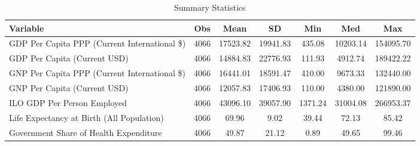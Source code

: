 \begin{table}
\centering
\caption{Summary Statistics}
\label{Sum_Stats}
\begin{tabular}{lcccccc}
\toprule
                                    Variable &  Obs &     Mean &       SD &     Min &      Med &       Max \\
\midrule
GDP Per Capita PPP (Current International \$) & 4066 & 17523.82 & 19941.83 & 435.08 & 10203.14 & 154095.70 \\
GDP Per Capita (Current USD) & 4066 & 14884.83 & 22776.93 & 111.93 & 4912.74 & 189422.22 \\
GNP Per Capita PPP (Current International \$) & 4066 & 16441.01 & 18591.47 & 410.00 & 9673.33 & 132440.00 \\
GNP Per Capita (Current USD) & 4066 & 12057.83 & 17406.93 & 110.00 & 4380.00 & 121890.00 \\
ILO GDP Per Person Employed & 4066 & 43096.10 & 39057.90 & 1371.24 & 31004.08 & 266953.37 \\
Life Expectancy at Birth (All Population) & 4066 & 69.96 & 9.02 & 39.44 & 72.13 & 85.42 \\
Government Share of Health Expenditure & 4066 & 49.87 & 21.12 & 0.89 & 49.65 & 99.46 \\
\bottomrule
\end{tabular}
\end{table}
